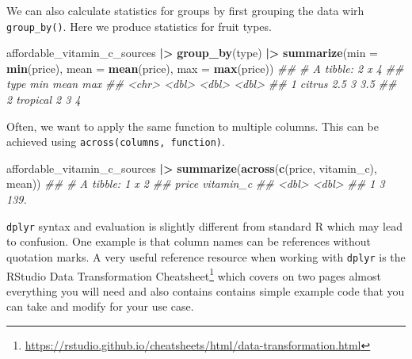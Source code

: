 \documentclass[
  notitlepage]{book}
\newenvironment{Shaded}{\begin{snugshade}}{\end{snugshade}}
\newcommand{\CommentTok}[1]{\textcolor[rgb]{0.56,0.35,0.01}{\textit{#1}}}
\newcommand{\DataTypeTok}[1]{\textcolor[rgb]{0.13,0.29,0.53}{#1}}
\newcommand{\ErrorTok}[1]{\textcolor[rgb]{0.64,0.00,0.00}{\textbf{#1}}}
\newcommand{\KeywordTok}[1]{\textcolor[rgb]{0.13,0.29,0.53}{\textbf{#1}}}
\newcommand{\NormalTok}[1]{#1}
\newcommand{\OperatorTok}[1]{\textcolor[rgb]{0.81,0.36,0.00}{\textbf{#1}}}
\newcommand{\StringTok}[1]{\textcolor[rgb]{0.31,0.60,0.02}{#1}}
\DeclareRobustCommand{\href}[2]{#2\footnote{\url{#1}}}
\begin{document}
We can also calculate statistics for groups by first grouping the data
wirh \texttt{group\_by()}. Here
we produce statistics for fruit types.

\begin{Shaded}
\begin{Highlighting}[]
\NormalTok{affordable\_vitamin\_c\_sources }\OperatorTok{|}\ErrorTok{\textgreater{}}\StringTok{ }
\StringTok{  }\KeywordTok{group\_by}\NormalTok{(type) }\OperatorTok{|}\ErrorTok{\textgreater{}}
\StringTok{  }\KeywordTok{summarize}\NormalTok{(}\DataTypeTok{min =} \KeywordTok{min}\NormalTok{(price), }
            \DataTypeTok{mean =} \KeywordTok{mean}\NormalTok{(price), }
            \DataTypeTok{max =} \KeywordTok{max}\NormalTok{(price))}
\CommentTok{\#\# \# A tibble: 2 x 4}
\CommentTok{\#\#   type       min  mean   max}
\CommentTok{\#\#   \textless{}chr\textgreater{}    \textless{}dbl\textgreater{} \textless{}dbl\textgreater{} \textless{}dbl\textgreater{}}
\CommentTok{\#\# 1 citrus     2.5     3   3.5}
\CommentTok{\#\# 2 tropical   2       3   4}
\end{Highlighting}
\end{Shaded}

Often, we want to apply the same function to multiple columns. This can
be achieved using \texttt{across(columns,\ function)}.

\begin{Shaded}
\begin{Highlighting}[]
\NormalTok{affordable\_vitamin\_c\_sources }\OperatorTok{|}\ErrorTok{\textgreater{}}\StringTok{ }
\StringTok{  }\KeywordTok{summarize}\NormalTok{(}\KeywordTok{across}\NormalTok{(}\KeywordTok{c}\NormalTok{(price, vitamin\_c), mean))}
\CommentTok{\#\# \# A tibble: 1 x 2}
\CommentTok{\#\#   price vitamin\_c}
\CommentTok{\#\#   \textless{}dbl\textgreater{}     \textless{}dbl\textgreater{}}
\CommentTok{\#\# 1     3      139.}
\end{Highlighting}
\end{Shaded}

\texttt{dplyr} syntax and evaluation is slightly different from standard R
which may lead to confusion. One example is that column names can be
references without quotation marks. A very useful reference resource
when working with \texttt{dplyr} is the \href{https://rstudio.github.io/cheatsheets/html/data-transformation.html}{RStudio Data Transformation Cheatsheet}
which covers on two pages almost everything you will need and also
contains contains simple example code that you can take and modify for
your use case.
\end{document}
